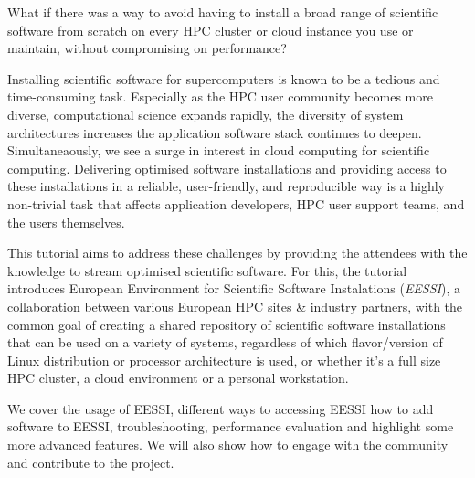 
What if there was a way to avoid having to install a broad range of scientific software from scratch on every HPC
cluster or cloud instance you use or maintain, without compromising on performance?

Installing scientific software for supercomputers is known to be a tedious and time-consuming task. Especially as the
HPC user community becomes more diverse, computational science expands rapidly, the diversity of system architectures
increases the application software stack continues to deepen. Simultaneaously, we see a surge in interest in cloud
computing for scientific computing. Delivering optimised software installations and providing access to these
installations in a reliable, user-friendly, and reproducible way is a highly non-trivial task that affects application
developers, HPC user support teams, and the users themselves.

This tutorial aims to address these challenges by providing the attendees with the knowledge to stream optimised
scientific software. For this, the tutorial introduces European Environment for Scientific Software Instalations
(\emph{EESSI}), a collaboration between various European HPC sites \& industry partners, with the common goal of
creating a shared repository of scientific software installations that can be used on a variety of systems, regardless
of which flavor/version of Linux distribution or processor architecture is used, or whether it’s a full size HPC
cluster, a cloud environment or a personal workstation.

We cover the usage of EESSI, different ways to accessing EESSI how to add software to EESSI, troubleshooting,
performance evaluation and highlight some more advanced features. We will also show how to engage with the community
and contribute to the project.
